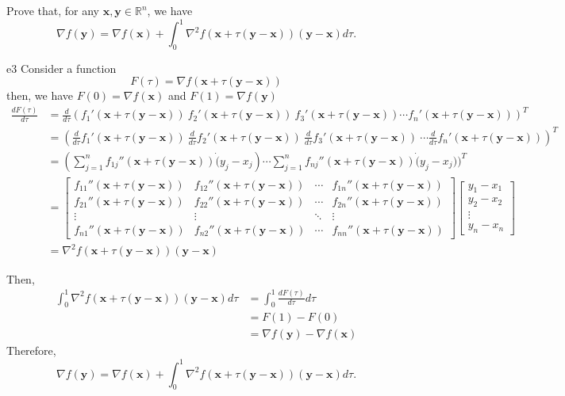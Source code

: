 \documentclass{article}
\begin{document}
\newpage
\newcommand{\RBB}{\mathbb{R}}
\newcommand{\xB}{\mathbf{x}}
\newcommand{\yB}{\mathbf{y}}
\begin{excercise}\label{e3}
Prove that, for any $\xB, \yB \in \RBB^n$, we have
\[
	\nabla f(\yB) = \nabla f(\xB) + \int_{0}^{1} \nabla^2 f (\xB + \tau (\yB - \xB)) (\yB - \xB) d\tau.
\]
\end{excercise}
\begin{PROOF}{e3}
	Consider a function
	\[
	F(\tau) = \nabla f(\xB + \tau(\yB - \xB))
	\]
	then, we have $F(0) = \nabla f(\xB)$ and $F(1) = \nabla f(\yB)$
	\[
	\begin{aligned}
	\frac{dF(\tau)}{d\tau} &= \frac{d}{d\tau}(f_1'(\xB + \tau(\yB - \xB)) \ f_2'(\xB + \tau(\yB - \xB)) \ f_3'(\xB + \tau(\yB - \xB)) \cdots f_n'(\xB + \tau(\yB - \xB)))^T \\
	&= (\frac{d}{d\tau} f_1'(\xB + \tau(\yB - \xB)) \ \frac{d}{d\tau} f_2'(\xB + \tau(\yB - \xB)) \ \frac{d}{d\tau} f_3'(\xB + \tau(\yB - \xB)) \ \cdots \frac{d}{d\tau} f_n'(\xB + \tau(\yB - \xB)) )^T \\
	&= (\sum_{j=1}^n f_{1j}''(\xB + \tau(\yB - \xB)) \dot (y_j - x_j)  \cdots \sum_{j=1}^n f_{nj}''(\xB + \tau(\yB - \xB)) \dot (y_j - x_j))^T\\
	&= \begin{bmatrix}
		f_{11}''(\xB + \tau(\yB - \xB)) & f_{12}''(\xB + \tau(\yB - \xB)) & \cdots & f_{1n}''(\xB + \tau(\yB - \xB)) \\
		f_{21}''(\xB + \tau(\yB - \xB)) & f_{22}''(\xB + \tau(\yB - \xB)) & \cdots & f_{2n}''(\xB + \tau(\yB - \xB)) \\
		\vdots & \vdots & \ddots & \vdots \\
		f_{n1}''(\xB + \tau(\yB - \xB)) & f_{n2}''(\xB + \tau(\yB - \xB)) & \cdots & f_{nn}''(\xB + \tau(\yB - \xB))
	\end{bmatrix}
	\begin{bmatrix}
		y_1 - x_1 \\
		y_2 - x_2 \\
		\vdots \\
		y_n - x_n
	\end{bmatrix}\\
	&= \nabla^2 f(\xB + \tau(\yB - \xB))(\yB - \xB)
	\end{aligned}
	\]

	Then,
	\[
	\begin{aligned}
	\int_0^1 \nabla^2 f (\xB + \tau (\yB - \xB)) (\yB - \xB) d\tau &= \int_0^1 \frac{dF(\tau)}{d\tau}d\tau\\
	&= F(1) - F(0) \\
	&= \nabla f(\yB) - \nabla f(\xB)
	\end{aligned}
	\]
	Therefore,
	\[
	\nabla f(\yB) = \nabla f(\xB) + \int_{0}^{1} \nabla^2 f (\xB + \tau (\yB - \xB)) (\yB - \xB) d\tau.
	\]
\end{PROOF}
\end{document}
